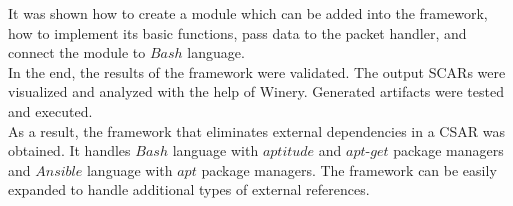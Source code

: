 It  was shown how to create a module which can be added into the framework, how to implement its basic functions, pass data to the packet handler, and connect the module to $Bash$ language. \\
In the end, the results of the framework were validated.
The output SCARs were visualized and analyzed with the help of Winery.
Generated artifacts were tested and executed.\\
As a result, the framework that eliminates external dependencies in a CSAR was obtained.
It handles $Bash$ language with $aptitude$ and $apt$-$get$ package managers and $Ansible$ language with $apt$ package managers.
The framework can be easily expanded to handle additional types of external references. 
